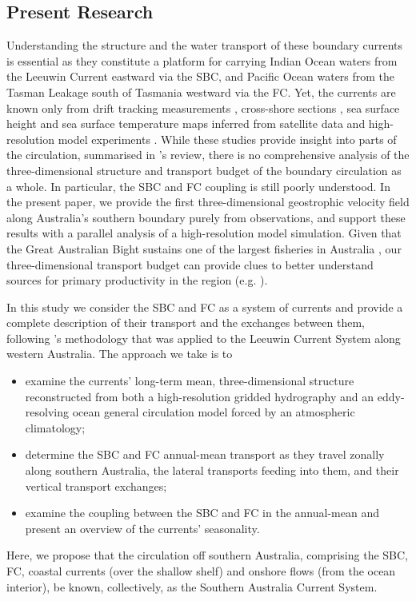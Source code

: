 \documentclass[preprint,3p,review,12pt]{elsarticle}
\newcommand{\citepos}[1]{\citeauthor{#1}'s \citeyearpar{#1}}
\begin{document}
\subsection{Present Research} \label{Present Research}
Understanding the structure and the water transport of these boundary currents is essential as they constitute a platform for carrying Indian Ocean waters from the Leeuwin Current eastward via the SBC, and Pacific Ocean waters from the Tasman Leakage south of Tasmania westward via the FC\@.
Yet, the currents are known only from drift tracking measurements \citep{Godfrey1986,Cresswell2004}, cross-shore sections \citep{Cresswell1993}, sea surface height and sea surface temperature maps inferred from satellite data \citep{Legeckis1981,Ridgway2004} and high-resolution model experiments \citep{Middleton2002,Middleton2003,Cirano2004,Batteen2009}. While these studies provide insight into parts of the circulation, summarised in \citepos{Middleton2007} review, there is no comprehensive analysis of the three-dimensional structure and transport budget of the boundary circulation as a whole. In particular, the SBC and FC coupling is still poorly understood. In the present paper, we provide the first three-dimensional geostrophic velocity field along Australia's southern boundary purely from observations, and support these results with a parallel analysis of a high-resolution model simulation. Given that the Great Australian Bight sustains one of the largest fisheries in Australia \citep{McClatchie2006}, our three-dimensional transport budget can provide clues to better understand sources for primary productivity in the region (e.g. \citeauthor{Cetina-Heredia2018} \citeyear{Cetina-Heredia2018}).

In this study we consider the SBC and FC as a system of currents and provide a complete description of their transport and the exchanges between them, following \citepos{Furue2017} methodology that was applied to the Leeuwin Current System along western Australia. The approach we take is to
\begin{itemize}
   \item examine the currents' long-term mean, three-dimensional structure reconstructed from both a high-resolution gridded hydrography and an eddy-resolving ocean general circulation model forced by an atmospheric climatology;
   \item determine the SBC and FC annual-mean transport as they travel zonally along southern Australia, the lateral transports feeding into them, and their vertical transport exchanges;
   \item examine the coupling between the SBC and FC in the annual-mean and present an overview of the currents' seasonality.
\end{itemize}
Here, we propose that the circulation off southern Australia, comprising the SBC, FC, coastal currents (over the shallow shelf) and onshore flows (from the ocean interior), be known, collectively, as the Southern Australia Current System.
\end{document}
